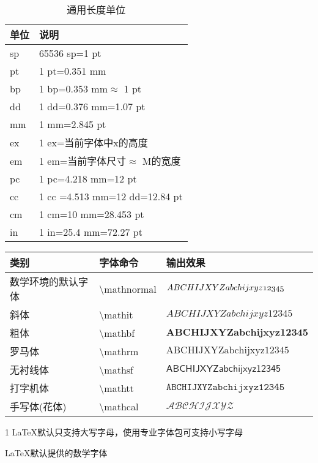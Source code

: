 \documentclass[UTF8,fontset=ubuntu]{ctexart}
\begin{document}
\begin{table}[H]
\begin{tabular}{l l}
	\hline
	单位 & 说明\\
	\hline
	sp & 65536 sp=1 pt\\
	pt & 1 pt=0.351 mm\\
	bp & 1 bp=0.353 mm$\approx$ 1 pt\\
	dd & 1 dd=0.376 mm=1.07 pt\\
	mm & 1 mm=2.845 pt\\
	ex & 1 ex=当前字体中x的高度\\
	em & 1 em=当前字体尺寸$\approx$ M的宽度\\
	pc & 1 pc=4.218 mm=12 pt\\
	cc & 1 cc =4.513 mm=12 dd=12.84 pt\\
	cm & 1 cm=10 mm=28.453 pt\\
	in & 1 in=25.4 mm=72.27 pt\\
	\hline
\end{tabular}
\caption{通用长度单位}
\end{table}

\begin{threeparttable}
\begin{tabular}{l l l}
	\hline
	类别 & 字体命令 & 输出效果\\\hline
	数学环境的默认字体 & \textbackslash mathnormal & $\mathnormal{ABCHIJXYZabchijxyz12345}$\\
	斜体 & \textbackslash mathit & $\mathit{ABCHIJXYZabchijxyz12345}$\\
	粗体 & \textbackslash mathbf & $\mathbf{ABCHIJXYZabchijxyz12345}$\\
	罗马体 & \textbackslash mathrm & $\mathrm{ABCHIJXYZabchijxyz12345}$\\
	无衬线体 & \textbackslash mathsf & $\mathsf{ABCHIJXYZabchijxyz12345}$\\
	打字机体 & \textbackslash mathtt & $\mathtt{ABCHIJXYZabchijxyz12345}$\\
	手写体(花体)\tnote{1} & \textbackslash mathcal & $\mathcal{ABCHIJXYZ}$\\\hline
\end{tabular}
\begin{tablenotes}
	\item[1] LaTeX默认只支持大写字母，使用专业字体包可支持小写字母
\end{tablenotes}
\caption{LaTeX默认提供的数学字体}
\end{threeparttable}
\end{document}
